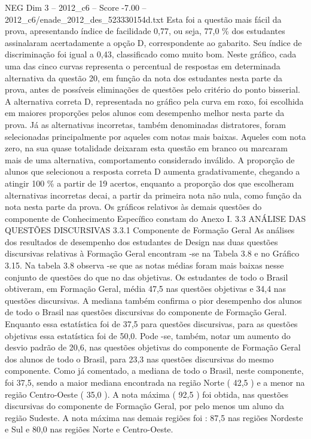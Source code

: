 \begin{textsample}{NEG Dim 3 – 2012\_c6 – Score -7.00 – 2012\_c6/enade\_2012\_des\_523330154d.txt}
Esta foi a questão mais fácil da prova, apresentando índice de facilidade 0,77, ou seja, 77,0 \% dos estudantes assinalaram acertadamente a opção D, correspondente ao gabarito.
Seu índice de discriminação foi igual a 0,43, classificado como muito bom.
Neste gráfico, cada uma das cinco curvas representa o percentual de respostas em determinada alternativa da questão 20, em função da nota dos estudantes nesta parte da prova, antes de possíveis eliminações de questões pelo critério do ponto bisserial.
A alternativa correta D, representada no gráfico pela curva em roxo, foi escolhida em maiores proporções pelos alunos com desempenho melhor nesta parte da prova.
Já as alternativas incorretas, também denominadas distratores, foram selecionadas principalmente por aqueles com notas mais baixas.
Aqueles com nota zero, na sua quase totalidade deixaram esta questão em branco ou marcaram mais de uma alternativa, comportamento considerado inválido.
A proporção de alunos que selecionou a resposta correta D aumenta gradativamente, chegando a atingir 100 \% a partir de 19 acertos, enquanto a proporção dos que escolheram alternativas incorretas decai, a partir da primeira nota não nula, como função da nota nesta parte da prova.
Os gráficos relativos às demais questões do componente de Conhecimento Específico constam do Anexo I. 3.3 ANÁLISE DAS QUESTÕES DISCURSIVAS 3.3.1 Componente de Formação Geral As análises dos resultados de desempenho dos estudantes de Design nas duas questões discursivas relativas à Formação Geral encontram -se na Tabela 3.8 e no Gráfico 3.15.
Na tabela 3.8 observa -se que as notas médias foram mais baixas nesse conjunto de questões do que no das objetivas.
Os estudantes de todo o Brasil obtiveram, em Formação Geral, média 47,5 nas questões objetivas e 34,4 nas questões discursivas.
A mediana também confirma o pior desempenho dos alunos de todo o Brasil nas questões discursivas do componente de Formação Geral.
Enquanto essa estatística foi de 37,5 para questões discursivas, para as questões objetivas essa estatística foi de 50,0.
Pode -se, também, notar um aumento do desvio padrão de 20,6, nas questões objetivas do componente de Formação Geral dos alunos de todo o Brasil, para 23,3 nas questões discursivas do mesmo componente.
Como já comentado, a mediana de todo o Brasil, neste componente, foi 37,5, sendo a maior mediana encontrada na região Norte ( 42,5 ) e a menor na região Centro-Oeste ( 35,0 ).
A nota máxima ( 92,5 ) foi obtida, nas questões discursivas do componente de Formação Geral, por pelo menos um aluno da região Sudeste.
A nota máxima nas demais regiões foi : 87,5 nas regiões Nordeste e Sul e 80,0 nas regiões Norte e Centro-Oeste.

\end{textsample}

